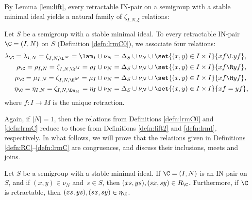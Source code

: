 By Lemma \ref{lem:lift}, every retractable IN-pair on a semigroup with a stable minimal ideal yields a natural family of $\zeta_{I,N,\xi}$ relations:

\begin{definition}
\label{defn:lrmC}
Let $S$ be a semigroup with a stable minimal ideal.  To every retractable IN-pair $\C=(I,N)$ on $S$ (Definition \ref{defn:lrmC0}), we associate four relations:
\begin{align*}
\lambda_\C=\lambda_{I,N}=\zeta_{I,N,{\L^M}}=\lam_I\cup\nu_N&=\Delta_S\cup\nu_N\cup\set{
  (x,y)\in I\times I}{ xf\L yf},\\
\rho_\C=\rho_{I,N}=\zeta_{I,N,{\R^M}}=\rho_I\cup\nu_N&=\Delta_S\cup\nu_N\cup\set{
  (x,y)\in I\times I}{ xf\R yf},\\
\mu_\C=\mu_{I,N}=\zeta_{I,N,{\H^M}}=\mu_I\cup\nu_N&=\Delta_S\cup\nu_N\cup\set{ (x,y)\in I\times I}{ xf\H yf},\\
\eta_\C=\eta_{I,N}=\zeta_{I,N,\De_M}=\eta_I\cup\nu_N&=\Delta_S\cup\nu_N\cup\set{ (x,y)\in I\times I}{ xf= yf},
\end{align*}
where $f:I\to M$ is the unique retraction.
\end{definition}

Again, if $|N|=1$, then the relations from Definitions \ref{defn:lrmC0} and
\ref{defn:lrmC} reduce to those from Definitions \ref{defn:lift2} and \ref{defn:lrmI}, respectively.  In what
follows, we will prove that the relations given in Definitions \ref{defn:RC}--\ref{defn:lrmC} are congruences, and discuss their inclusions, meets and
joins.

\begin{lemma}
\label{lem:nu}
Let $S$ be a semigroup with a stable minimal ideal.  If $\C=(I,N)$ is an IN-pair on $S$, and if $(x,y)\in\nu_N$ and~$s\in S$, then $(xs,ys),(sx,sy)\in R_\C$.  Furthermore, if $\C$ is retractable, then ${(xs,ys),(sx,sy)\in\eta_\C}$.
\end{lemma}

